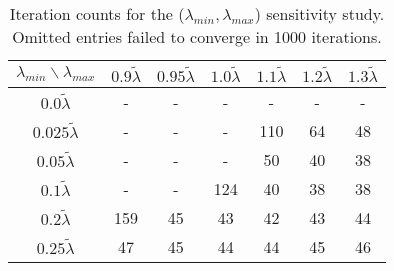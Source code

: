 \def\tlam {{\tilde \lambda}}
\begin{table}
\small
\centering
\begin{tabular}{||c|c c c c c c||}
  \hline
  $\lambda_{min}\backslash \lambda_{max}$ & \rule{0pt}{2.5ex}
$0.9 \tlam$ & $0.95 \tlam$ & $1.0 \tlam$ & $1.1 \tlam$ & $1.2 \tlam$ & $1.3 \tlam$\\ 
\hline\hline \rule{0pt}{2.5ex}
$0.0   \tlam$ & - & - & - & - & - & - \\
$0.025 \tlam$ & - & - & - & 110  & 64   & 48 \\
$0.05  \tlam$ & - & - & - & 50   & 40   & 38 \\
$0.1   \tlam$ & - & - & 124  & 40   & 38   & 38 \\
$0.2   \tlam$ & 159  & 45   & 43   & 42   & 43   & 44 \\
$0.25  \tlam$ & 47   & 45   & 44   & 44   & 45   & 46 \\
\hline
\end{tabular}
\caption{\small
Iteration counts for the ($\lambda_{min},\lambda_{max}$) sensitivity study.
Omitted entries failed to converge in 1000 iterations.
\label{table:kershaw-eig-multiplier-0.3}}
\end{table}
